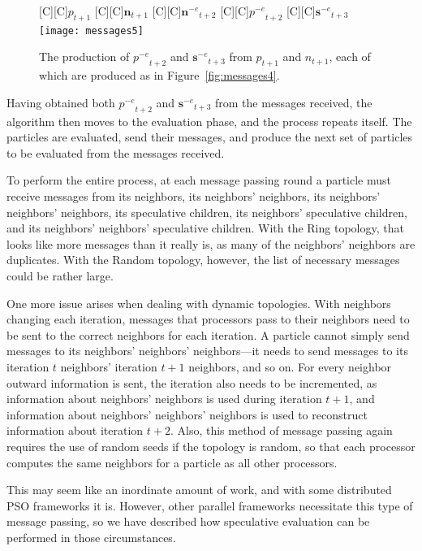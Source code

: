 \documentclass[journal,letterpaper]{IEEEtran}
\newcommand{\fig}[1]{Figure~\ref{fig:#1}}
\providecommand{\noeval}[1]{\ensuremath{#1^{-e}}}
\providecommand{\p}{\ensuremath{p}}
\providecommand{\sset}{\ensuremath{\mathbf{s}}}
\providecommand{\n}{\ensuremath{n}}
\providecommand{\nset}{\ensuremath{\mathbf{n}}}
\begin{document}
\begin{figure}
  \centering
  [C][C]{$\p_{t+1}$}
  [C][C]{$\nset_{t+1}$}
  [C][C]{$\noeval{\nset}_{t+2}$}
  [C][C]{$\noeval{\p}_{t+2}$}
  [C][C]{$\noeval{\sset}_{t+3}$}
  \texttt{[image: messages5]}
  \caption{The production of $\noeval{\p}_{t+2}$ and $\noeval{\sset}_{t+3}$
  from $\p_{t+1}$ and $\n_{t+1}$, each of which are produced as in
  \fig{messages4}.}
  \label{fig:messages5}
\end{figure}

Having obtained both $\noeval{\p}_{t+2}$ and $\noeval{\sset}_{t+3}$ from the
messages received, the algorithm then moves to the evaluation phase, and the
process repeats itself.  The particles are evaluated, send their messages, and
produce the next set of particles to be evaluated from the messages received.

To perform the entire process, at each message passing round a particle must
receive messages from its neighbors, its neighbors' neighbors, its neighbors'
neighbors' neighbors, its speculative children, its neighbors' speculative
children, and its neighbors' neighbors' speculative children.  With the Ring
topology, that looks like more messages than it really is, as many of the
neighbors' neighbors are duplicates.  With the Random topology, however, the
list of necessary messages could be rather large.  

One more issue arises when dealing with dynamic topologies.  With neighbors
changing each iteration, messages that processors pass to their neighbors need
to be sent to the correct neighbors for each iteration.  A particle cannot
simply send messages to its neighbors' neighbors' neighbors---it needs to send
messages to its iteration $t$ neighbors' iteration $t+1$ neighbors, and so on.
For every neighbor outward information is sent, the iteration also needs to be
incremented, as information about neighbors' neighbors is used during iteration
$t+1$, and information about neighbors' neighbors' neighbors is used to
reconstruct information about iteration $t+2$.  Also, this method of message
passing again requires the use of random seeds if the topology is random, so
that each processor computes the same neighbors for a particle as all other
processors.

This may seem like an inordinate amount of work, and with some distributed PSO
frameworks it is.  However, other parallel frameworks necessitate this type of
message passing, so we have described how speculative evaluation can be
performed in those circumstances.
\end{document}
